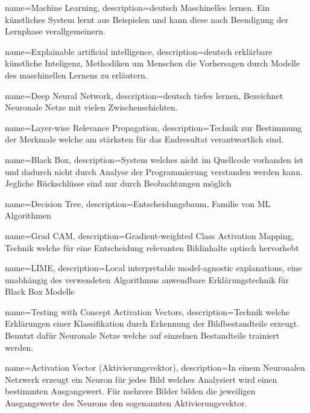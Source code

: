 
{
	name=Machine Learning,
	description={deutsch Maschinelles lernen. Ein künstliches System lernt aus Beispielen und kann diese nach Beendigung der Lernphase verallgemeinern. }
}

{
	name=Explainable artificial intelligence,
	description={deutsch erklärbare künstliche Inteligenz, Methodiken um Menschen die Vorhersagen durch Modelle des maschinellen Lernens zu erläutern. }
}

{
    name=Deep Neural Network,
    description={deutsch tiefes lernen, Bezeichnet Neuronale Netze mit vielen Zwischenschichten.}
}

{
	name=Layer-wise Relevance Propagation,
	description={Technik zur Bestimmung der Merkmale welche am stärksten für das Endresultat verantwortlich sind.}                                   
}                             

{
	name=Black Box,
	description={System welches nicht im Quellcode vorhanden ist und dadurch nicht durch Analyse der Programmierung verstanden werden kann. Jegliche Rückschlüsse sind nur durch Beobachtungen möglich}                                   
}     

{
	name=Decision Tree,
	description={Entscheidungsbaum, Familie von ML Algorithmen}                                   
}     

{
	name=Grad CAM,
	description={Gradient-weighted Class Activation Mapping, Technik welche für eine Entscheidung relevanten Bildinhalte optisch hervorhebt}  
}

{
	name=LIME,
	description={Local interpretable model-agnostic explanations, eine unabhängig des verwendeten Algorithmus anwendbare Erklärungstechnik für Black Box Modelle }
}

{
	name=Testing with Concept Activation Vectors,
	description={Technik welche Erklärungen einer Klassifikation durch Erkennung der Bildbestandteile erzeugt. Benutzt dafür Neuronale Netze welche auf einzelnen Bestandteile trainiert werden. \parencite{Kim2017}}
}

{
	name=Activation Vector (Aktivierungsvektor),
	description={In einem Neuronalen Netzwerk erzeugt ein Neuron für jedes Bild welches Analysiert wird einen bestimmten Ausgangswert. Für mehrere Bilder bilden die jeweiligen Ausgangswerte des Neurons den sogenannten Aktivierungsvektor.}
}

